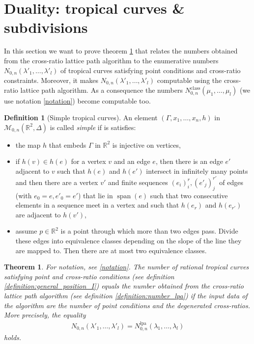 \documentclass[11pt,reqno,a4]{amsart}
\theoremstyle{dotless}
\newtheorem{theorem}[corollary]{Theorem}
\theoremstyle{definition}
\newtheorem{definition}[corollary]{Definition}
\begin{document}
\section{Duality: tropical curves \& subdivisions} \label{section:duality:tropical_curves_subdivisions}


In this section we want to prove theorem \ref{theorem:same_numbers} that relates the numbers obtained from the cross-ratio lattice path algorithm to the enumerative numbers $N_{0,n}\left(\lambda'_1,\dots,\lambda'_l\right)$ of tropical curves satisfying point conditions and cross-ratio constraints. Moreover, it makes $N_{0,n}\left(\lambda'_1,\dots,\lambda'_l\right)$ computable using the cross-ratio lattice path algorithm. As a consequence the numbers $N^{\textrm{class}}_{0,n}\left( \mu_1,\dots,\mu_l \right)$ (we use notation \ref{notation}) become computable too.



\begin{definition}[Simple tropical curves]\label{definition:simple_curves}
An element $\left( \Gamma,x_1,\dots,x_n,h \right)$ in $\mathcal{M}_{0,n}\left(\mathbb{R}^2,\Delta \right)$ is called \textit{simple} if is satisfies:
\begin{itemize}
\item
the map $h$ that embeds $\Gamma$ in $\mathbb{R}^2$ is injective on vertices,
\item
if $h(v)\in h(e)$ for a vertex $v$ and an edge $e$, then there is an edge $e'$ adjacent to $v$ such that $h(e)$ and $h(e')$ intersect in infinitely many points and then there are a vertex $v'$ and finite sequences $(e_i)^r_i,(e'_j)^{r'}_j$ of edges (with $e_0=e,e'_0=e'$) that lie in $\operatorname{span}(e)$ such that two consecutive elements in a sequence meet in a vertex and such that $h(e_r)$ and $h(e_{r'})$ are adjacent to $h(v')$,
\item
assume $p\in\mathbb{R}^2$ is a point through which more than two edges pass. Divide these edges into equivalence classes depending on the slope of the line they are mapped to. Then there are at most two equivalence classes.
\end{itemize}
\end{definition}


\begin{theorem}\label{theorem:same_numbers}
For notation, see \ref{notation}. The number of rational tropical curves satisfying point and cross-ratio conditions (see definition \ref{definition:general_position_I}) equals the number obtained from the cross-ratio lattice path algorithm (see definition \ref{definition:number_lpa}) if the input data of the algorithm are the number of point conditions and the degenerated cross-ratios. More precisely, the equality
\begin{align*}
N_{0,n}\left(\lambda'_1,\dots,\lambda'_l\right)
=
N_{0,n}^{\textrm{lpa}}\left(\lambda_1,\dots,\lambda_l\right)
\end{align*}
holds.
\end{theorem}
\end{document}
